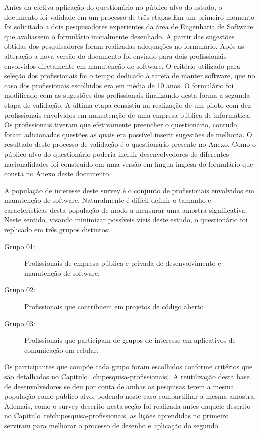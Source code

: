 Antes da efetiva aplicação do questionário no público-alvo do estudo, o
documento foi validade em um processo de três etapas.Em um primeiro momento foi
solicitado a dois pesquisadores experientes da área de Engenharia de Software
que avaliassem o formulário inicialmente desenhado. A partir das sugestões
obtidas dos pesquisadores foram realizadas adequações no formulário. Após as
alteração a nova versão do documento foi enviado para dois profissionais
envolvidos diretamente em manutenção de software. O critério utilizado para
seleção dos profissionais foi o tempo dedicado à tarefa de manter software, que
no caso dos profissionais escolhidos era em média de 10 anos. O formulário foi
modificado com as sugestões dos profissionais finalizando desta forma a segunda
etapa de validação. A última etapa consistiu na realização de um piloto com dez
profissionais envolvidos em manutenção de uma empresa pública de informática. Os
profissionais tiveram que efetivamente preencher o questionário, contudo, foram
adicionadas questões as quais era possível inserir sugestões de melhoria. O
resultado deste processo de validação é o questionário presente no Anexo. Como o
público-alvo do questionário poderia incluir desenvolvedores de diferentes
nacionalidades foi construído em uma versão em língua inglesa do formulário que
consta no Anexo deste documento.


A população de interesse deste survey é o conjunto de profissionais envolvidos
em manutenção de software. Naturalmente é difícil definir o tamanho e
características desta população de modo a mensurar uma amostra significativa.
Neste sentido, visando minimizar possíveis víeis deste estudo, o questionário
foi replicado em três grupos distintos:

\begin{description}
	\item[Grupo 01:] Profissionais de empresa pública e privada de
			desenvolvimento e manutenção de software.
	\item[Grupo 02:] Profissionais que contribuem em projetos de
		código aberto
   	\item[Grupo 03:] Profissionais que participam de grupos de
		interesse em aplicativos de comunicação em celular.
\end{description}

Os participantes que compõe cada grupo foram escolhidos conforme critérios que
são detalhados no Capítulo~\ref{ch:pesquisa-profissionais}. A reutilização desta
base de desenvolvedores se deu por conta de ambas as pesquisas terem a mesma
população como público-alvo, podendo neste caso compartilhar a mesma amostra.
Ademais, como o survey descrito nesta seção foi realizada antes daquele descrito
no Capítulo~ref{ch:pesquisa-profissionais}, as lições aprendidas no primeiro
serviram para melhorar o processo de desenho e aplicação do segundo.


